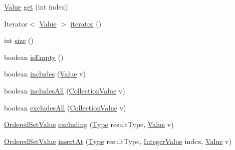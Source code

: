 \begin{DoxyCompactItemize}
\hyperlink{classorg_1_1tzi_1_1use_1_1uml_1_1ocl_1_1value_1_1_value}{Value} \hyperlink{classorg_1_1tzi_1_1use_1_1uml_1_1ocl_1_1value_1_1_ordered_set_value_a116a44866617fe145ce5e2f524e0db6d}{get} (int index)
\item 
Iterator$<$ \hyperlink{classorg_1_1tzi_1_1use_1_1uml_1_1ocl_1_1value_1_1_value}{Value} $>$ \hyperlink{classorg_1_1tzi_1_1use_1_1uml_1_1ocl_1_1value_1_1_ordered_set_value_a5ed7ea3bf1d79a8acabe6cd4cc45bd78}{iterator} ()
\item 
int \hyperlink{classorg_1_1tzi_1_1use_1_1uml_1_1ocl_1_1value_1_1_ordered_set_value_ac6daea375113da0afb11712152dd1c29}{size} ()
\item 
boolean \hyperlink{classorg_1_1tzi_1_1use_1_1uml_1_1ocl_1_1value_1_1_ordered_set_value_aeac4745618c5b4acbdc99aaadbdecb53}{is\-Empty} ()
\item 
boolean \hyperlink{classorg_1_1tzi_1_1use_1_1uml_1_1ocl_1_1value_1_1_ordered_set_value_a506b04503f861b5fc28dfe75f00ab79e}{includes} (\hyperlink{classorg_1_1tzi_1_1use_1_1uml_1_1ocl_1_1value_1_1_value}{Value} v)
\item 
boolean \hyperlink{classorg_1_1tzi_1_1use_1_1uml_1_1ocl_1_1value_1_1_ordered_set_value_ae859340b3ecf21587a4ffceb8e436d7e}{includes\-All} (\hyperlink{classorg_1_1tzi_1_1use_1_1uml_1_1ocl_1_1value_1_1_collection_value}{Collection\-Value} v)
\item 
boolean \hyperlink{classorg_1_1tzi_1_1use_1_1uml_1_1ocl_1_1value_1_1_ordered_set_value_ac038ab521df2feffd829c1474b0bd8e6}{excludes\-All} (\hyperlink{classorg_1_1tzi_1_1use_1_1uml_1_1ocl_1_1value_1_1_collection_value}{Collection\-Value} v)
\item 
\hyperlink{classorg_1_1tzi_1_1use_1_1uml_1_1ocl_1_1value_1_1_ordered_set_value}{Ordered\-Set\-Value} \hyperlink{classorg_1_1tzi_1_1use_1_1uml_1_1ocl_1_1value_1_1_ordered_set_value_af2de0b186fc50cca0791d0ef9861ccd0}{excluding} (\hyperlink{interfaceorg_1_1tzi_1_1use_1_1uml_1_1ocl_1_1type_1_1_type}{Type} result\-Type, \hyperlink{classorg_1_1tzi_1_1use_1_1uml_1_1ocl_1_1value_1_1_value}{Value} v)
\item 
\hyperlink{classorg_1_1tzi_1_1use_1_1uml_1_1ocl_1_1value_1_1_ordered_set_value}{Ordered\-Set\-Value} \hyperlink{classorg_1_1tzi_1_1use_1_1uml_1_1ocl_1_1value_1_1_ordered_set_value_a3cea8f9a4de781a5591b8073d770270f}{insert\-At} (\hyperlink{interfaceorg_1_1tzi_1_1use_1_1uml_1_1ocl_1_1type_1_1_type}{Type} result\-Type, \hyperlink{classorg_1_1tzi_1_1use_1_1uml_1_1ocl_1_1value_1_1_integer_value}{Integer\-Value} index, \hyperlink{classorg_1_1tzi_1_1use_1_1uml_1_1ocl_1_1value_1_1_value}{Value} v)

\end{DoxyCompactItemize}
